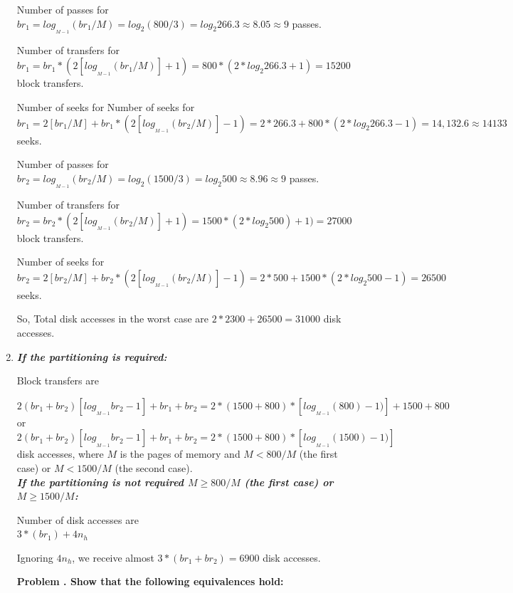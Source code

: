 \documentclass[paper=8.27in:11.69in, 14pt, DIV=calc]{scrartcl}
\newcounter{numbers}
\newcommand\printnumbers{\refstepcounter{numbers}\thenumbers}
\begin{document}
\begin{enumerate}[label=\alph*.]
Number of passes for $b{r_{1}} = log_{_{M - 1}}(b{r_{1}}/M) = log_{2}(800/3) = log_{2}266.3 \approx 8.05 \approx 9$ passes.

Number of transfers for $b{r_{1}} = b{r_{1}}*(2[log_{_{M - 1}}(b{r_{1}} / M)] + 1) = 800*(2 * log_{2}266.3 + 1) = 15200$ block transfers.

Number of seeks for Number of seeks for $b{r_{1}} = 2[b{r_{1}} / M] + b{r_{1}}*(2[log_{_{M - 1}}(b{r_{2}} / M)] - 1) = 2*266.3 + 800*(2*log_{2}266.3 - 1) = 14,132.6‬‬ \approx 14133$ seeks.

Number of passes for $b{r_{2}} = log_{_{M - 1}}(b{r_{2}}/M) = log_{2}(1500/3) = log_{2}500 \approx 8.96 \approx 9$ passes.

Number of transfers for $b{r_{2}} = b{r_{2}}*(2[log_{_{M - 1}}(b{r_{2}} / M)] + 1) = 1500*(2 * log_{2}500)+1) = 27000$‬ block transfers.

Number of seeks for $b{r_{2}} = 2[b{r_{2}} / M] + b{r_{2}}*(2[log_{_{M - 1}}(b{r_{2}} / M)] - 1) = 2*500 + 1500*(2*log_{2}500 - 1) = 26500$ ‬seeks.

So, Total disk accesses in the worst case are $2*2300 + 26500 = 31000$‬ disk accesses.

\item \textbf{\textit{If the partitioning is required:}}

Block transfers are 

$2(b{r_{1}} + b{r_{2}})[log_{_{M - 1}}b{r_{2}} - 1] + b{r_{1}} + b{r_{2}} = 2*(1500+800)*[log_{_{M - 1}}(800) - 1)] + 1500 + 800$\\
or\\
$2(b{r_{1}} + b{r_{2}})[log_{_{M - 1}}b{r_{2}} - 1] + b{r_{1}} + b{r_{2}} = 2*(1500+800)*[log_{_{M - 1}}(1500) - 1)]$ disk accesses, where $M$ is the pages of memory and $M < 800/M$ (the first case) or $M < 1500/M$ (the second case).\\

\textbf{\textit{If the partitioning is not required $M \geq 800/M$ (the first case) or $M \geq 1500/M$:}}

Number of disk accesses are\\
$3*(b{r_{1}}) + 4n_{h}$

Ignoring $4n_{h}$, we receive almost $3*(b{r_{1}} + b{r_{2}}) = 6900$ disk accesses.

\textbf{Problem \printnumbers . Show that the following equivalences hold:}

\begin{enumerate}[label=\alph*.]


\end{enumerate}
\end{enumerate}
\end{document}
